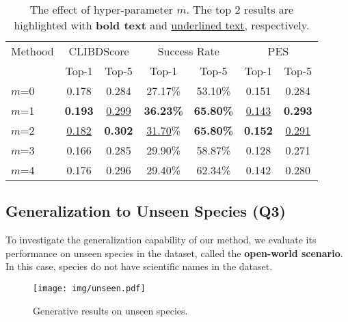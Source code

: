 \begin{table}[h]
\centering
\caption{The effect of hyper-parameter $m$. The top 2 results are highlighted with \textbf{bold text} and \underline{underlined text}, respectively.}
\label{tab:ablation_m}
\begin{adjustbox}{width=1\linewidth}
    \begin{tabular}{l|cc|cc|cc}
    \toprule
    \multicolumn{1}{c|}{Methood} & \multicolumn{2}{c|}{CLIBDScore} & \multicolumn{2}{c|}{Success Rate} & \multicolumn{2}{c}{PES} \\
    & Top-1 & Top-5 & Top-1 & Top-5 & Top-1 & Top-5 \\
    \midrule
    $m$=0 & 0.178 & 0.284 & 27.17\% & 53.10\% & 0.151 & 0.284 \\
    $m$=1 & \textbf{0.193} & \underline{0.299} & \textbf{36.23\%} & \textbf{65.80\%} & \underline{0.143} & \textbf{0.293} \\
    $m$=2 & \underline{0.182} & \textbf{0.302} & \underline{31.70}\% & \textbf{65.80\%} & \textbf{0.152} & \underline{0.291} \\
    $m$=3 & 0.166 & 0.285 & 29.90\% & 58.87\% & 0.128 & 0.271 \\
    $m$=4 & 0.176 & 0.296 & 29.40\% & 62.34\% & 0.142 & 0.280 \\
    \bottomrule
    \end{tabular}
\end{adjustbox}
\end{table}




\subsection{Generalization to Unseen Species (Q3)}





To investigate the generalization capability of our method, we evaluate its performance on unseen species in the dataset, called the \textbf{open-world scenario}. In this case, species do not have scientific names in the dataset.

\begin{figure}[!htb]
    \centering
    \texttt{[image: img/unseen.pdf]}
    \caption{Generative results on unseen species.}
    \vspace{-1.5em}
    \label{fig:unseen}
\end{figure}

